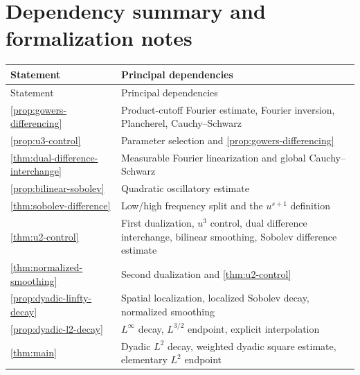 \documentclass[11pt]{article}
\theoremstyle{definition}
\theoremstyle{remark}
\newcommand{\1}{\mathbf 1}
\begin{document}
\section{Dependency summary and formalization notes}

\begin{longtable}{>{\raggedright\arraybackslash}p{}>{\raggedright\arraybackslash}p{}}
\toprule
Statement & Principal dependencies \\
\midrule
\endfirsthead
\toprule
Statement & Principal dependencies \\
\midrule
\endhead
\cref{prop:gowers-differencing} & Product-cutoff Fourier estimate, Fourier inversion, Plancherel, Cauchy--Schwarz \\
\cref{prop:u3-control} & Parameter selection and \cref{prop:gowers-differencing} \\
\cref{thm:dual-difference-interchange} & Measurable Fourier linearization and global Cauchy--Schwarz \\
\cref{prop:bilinear-sobolev} & Quadratic oscillatory estimate \\
\cref{thm:sobolev-difference} & Low/high frequency split and the $u^{s+1}$ definition \\
\cref{thm:u2-control} & First dualization, $u^3$ control, dual difference interchange, bilinear smoothing, Sobolev difference estimate \\
\cref{thm:normalized-smoothing} & Second dualization and \cref{thm:u2-control} \\
\cref{prop:dyadic-linfty-decay} & Spatial localization, localized Sobolev decay, normalized smoothing \\
\cref{prop:dyadic-l2-decay} & $L^\infty$ decay, $L^{3/2}$ endpoint, explicit interpolation \\
\cref{thm:main} & Dyadic $L^2$ decay, weighted dyadic square estimate, elementary $L^2$ endpoint \\
\bottomrule
\end{longtable}
\end{document}
